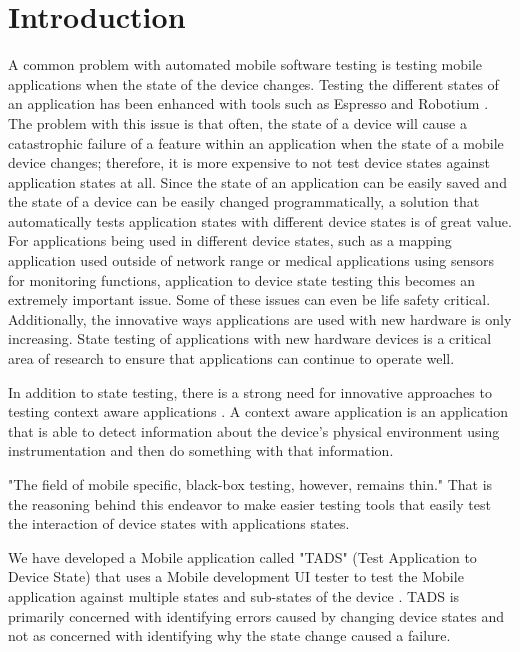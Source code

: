 \section{Introduction}
A common problem with automated mobile software testing is testing mobile applications when the state of the device changes.  Testing the different states of an application has been enhanced with tools such as Espresso and Robotium \cite{optimusinformationinc2016}. The problem with this issue is that often, the state of a device will cause a catastrophic failure of a feature within an application when the state of a mobile device changes; therefore, it is more expensive to not test device states against application states at all.  Since the state of an application can be easily saved and the state of a device can be easily changed programmatically, a solution that automatically tests application states with different device states is of great value.  For applications being used in different device states, such as a mapping application used outside of network range or medical applications using sensors for monitoring functions, application to device state testing this becomes an extremely important issue.  Some of these issues can even be life safety critical.  Additionally, the innovative ways applications are used with new hardware is only increasing.  State testing of applications with new hardware devices is a critical area of research to ensure that applications can continue to operate well. 

In addition to state testing, there is a strong need for innovative approaches to testing context aware applications \cite{Luo:2017:TLT:3139486.3130945}.  A context aware application is an application that is able to detect information about the device's physical environment using instrumentation and then do something with that information.  

"The field of mobile specific, black-box testing, however, remains thin." \cite{paulovsky2017high}  That is the reasoning behind this endeavor to make easier testing tools that easily test the interaction of device states with applications states.  

We have developed a Mobile application called "TADS" (Test Application to Device State) that uses a Mobile development UI tester to test the Mobile application against multiple states and sub-states of the device \cite{366932}.  TADS is primarily concerned with identifying errors caused by changing device states and not as concerned with identifying why the state change caused a failure.


